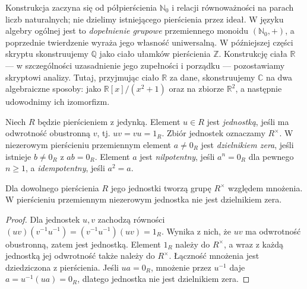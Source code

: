 \begin{uwaga}
\label{aa:uw:z-vs-quotient-ring}
Konstrukcja zaczyna się od półpierścienia $\mathbb N_0$
i relacji równoważności na parach liczb naturalnych;
nie dzielimy istniejącego pierścienia przez ideał.
W języku algebry ogólnej jest to \emph{dopełnienie grupowe}
przemiennego monoidu $(\mathbb N_0,+)$, a poprzednie
twierdzenie wyraża jego własność uniwersalną.
W późniejszej części skryptu skonstruujemy $\mathbb Q$
jako ciało ułamków pierścienia $\mathbb Z$.
Konstrukcję ciała $\mathbb R$ --- w szczególności uzasadnienie
jego zupełności i porządku --- pozostawiamy skryptowi analizy.
Tutaj, przyjmując ciało $\mathbb R$ za dane, skonstruujemy
$\mathbb C$ na dwa algebraiczne sposoby:
jako $\mathbb R[x]/(x^2+1)$ oraz na zbiorze $\mathbb R^2$,
a następnie udowodnimy ich izomorfizm.
\end{uwaga}

\begin{definicja}
\label{aa:def:pierscien-jednostki}
Niech $R$ będzie pierścieniem z jedynką.
Element $u\in R$ jest \emph{jednostką}, jeśli ma odwrotność
obustronną $v$, tj. $uv=vu=1_R$. Zbiór jednostek oznaczamy $R^\times$.
W niezerowym pierścieniu przemiennym element $a\ne0_R$ jest
\emph{dzielnikiem zera}, jeśli istnieje $b\ne0_R$ z $ab=0_R$.
Element $a$ jest \emph{nilpotentny}, jeśli $a^n=0_R$ dla pewnego
$n\ge1$, a \emph{idempotentny}, jeśli $a^2=a$.
\end{definicja}
\begin{stwierdzenie}
\label{aa:st:unit-group}
Dla dowolnego pierścienia $R$ jego jednostki tworzą grupę
$R^\times$ względem mnożenia. W pierścieniu przemiennym
niezerowym jednostka nie jest dzielnikiem zera.
\end{stwierdzenie}
\begin{proof}
Dla jednostek $u,v$ zachodzą równości
$(uv)(v^{-1}u^{-1})=(v^{-1}u^{-1})(uv)=1_R$.
Wynika z nich, że $uv$ ma odwrotność obustronną,
zatem jest jednostką. Element $1_R$ należy do $R^\times$,
a wraz z każdą jednostką jej odwrotność także należy do $R^\times$.
Łączność mnożenia jest dziedziczona z pierścienia.
Jeśli $ua=0_R$, mnożenie przez $u^{-1}$ daje
$a=u^{-1}(ua)=0_R$, dlatego jednostka nie jest dzielnikiem zera.
\end{proof}

